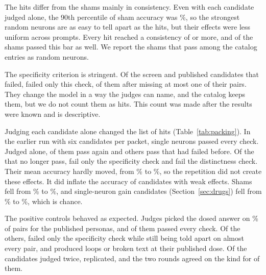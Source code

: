 \documentclass[11pt]{article}
\begin{document}
The hits differ from the shams mainly in consistency. Even with each candidate judged alone, the 90th percentile of
sham accuracy was
\ShamPAcc\%, so the strongest random neurons are as easy to tell apart as the hits, but their effects were less
uniform across prompts. Every hit reached a consistency of \ShamPCons or more, and \NShamHits of the \NShamJudged
shams passed this bar as well. We report the shams that pass among the catalog entries as random neurons.

The specificity criterion is stringent. Of the screen and published candidates that failed, \NearMiss failed only
this check,
\NearMissOne of them after missing at most one of their pairs. They change the model in a way the judges can name, and
the catalog keeps them, but we do not count them as hits. This count was made after the results were known and is
descriptive.

Judging each candidate alone changed the list of hits (Table~\ref{tab:packing}). In the earlier run with six
candidates per packet, \PackedHits single neurons passed every check. Judged alone, \PackedBoth of them pass again and
\SoloOnly others pass that had failed before. Of the \PackedLost that no longer pass, \LostSpecificOnly fail only the
specificity check and \LostDistinct fail the distinctness check. Their mean accuracy hardly moved, from
\PackedHitAcc\% to \SoloHitAcc\%, so the repetition did not create these effects. It did inflate the accuracy of
candidates with weak effects. Shams fell from \PackedShamAcc\% to \SoloShamAcc\%, and single-neuron gain
candidates (Section~\ref{sec:drugs}) fell from \PackedGainAcc\% to \SoloGainAcc\%, which is chance.

\begin{table}[!htbp]
\centering

\caption{Judging six candidates per packet against judging each candidate alone, over the same candidates, answers
and checks. Accuracy and consistency are pooled over both rounds.}
\label{tab:packing}
\end{table}

The positive controls behaved as expected. Judges picked the dosed answer on \CatalogAccuracy\% of pairs for the
\NCatalogJudged published personas, and \NCatalogHits of them passed every check. Of the others, \NCatalogSpecOnly
failed only the specificity check while still being told apart on almost every pair, and \NCatalogBroken produced
loops or broken text at their published dose. Of the \NTwice candidates judged twice, \NReplicated replicated, and
the two rounds agreed on the kind for \NKindAgree of them.
\end{document}
